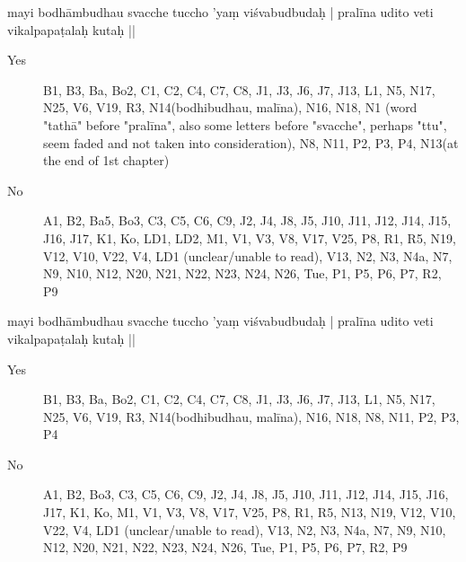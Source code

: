 \begin{ekdosis}
\begin{marma}[hp01_055]

    mayi bodhāmbudhau svacche tuccho 'yaṃ viśvabudbudaḥ |
    pralīna udito veti vikalpapaṭalaḥ kutaḥ ||

    \begin{description}
    \item[Yes] B1, B3, Ba, Bo2, C1, C2, C4, C7, C8, J1, J3, J6, J7, J13, L1, N5, N17, N25, V6, V19, R3, N14(bodhibudhau, malīna), N16, N18, N1 (word "tathā" before "pralīna", also some letters before "svacche", perhaps "ttu", seem faded and not taken into consideration), N8, N11, P2, P3, P4, N13(at the end of 1st chapter)
    \item[No] A1, B2, Ba5, Bo3, C3, C5, C6, C9, J2, J4, J8, J5, J10, J11, J12, J14, J15, J16, J17, K1, Ko, LD1, LD2, M1, V1, V3, V8, V17, V25, P8, R1, R5, N19, V12, V10, V22, V4, LD1 (unclear/unable to read), V13, N2, N3, N4a, N7, N9, N10, N12, N20, N21, N22, N23, N24, N26, Tue, P1, P5, P6, P7, R2, P9
    \end{description}


    mayi bodhāmbudhau svacche tuccho 'yaṃ viśvabudbudaḥ |
    pralīna udito veti vikalpapaṭalaḥ kutaḥ ||

    \begin{description}
    \item[Yes] B1, B3, Ba, Bo2, C1, C2, C4, C7, C8, J1, J3, J6, J7, J13, L1, N5, N17, N25, V6, V19, R3, N14(bodhibudhau, malīna), N16, N18, N8, N11, P2, P3, P4
    \item[No] A1, B2, Bo3, C3, C5, C6, C9, J2, J4, J8, J5, J10, J11, J12, J14, J15, J16, J17, K1, Ko, M1, V1, V3, V8, V17, V25, P8, R1, R5, N13, N19, V12, V10, V22, V4, LD1 (unclear/unable to read), V13, N2, N3, N4a, N7, N9, N10, N12, N20, N21, N22, N23, N24, N26, Tue, P1, P5, P6, P7, R2, P9
    \end{description}



\end{marma}
\end{ekdosis}
